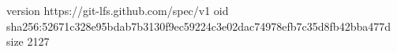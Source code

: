 version https://git-lfs.github.com/spec/v1
oid sha256:52671c328e95bdab7b3130f9ec59224c3e02dac74978efb7c35d8fb42bba477d
size 2127
